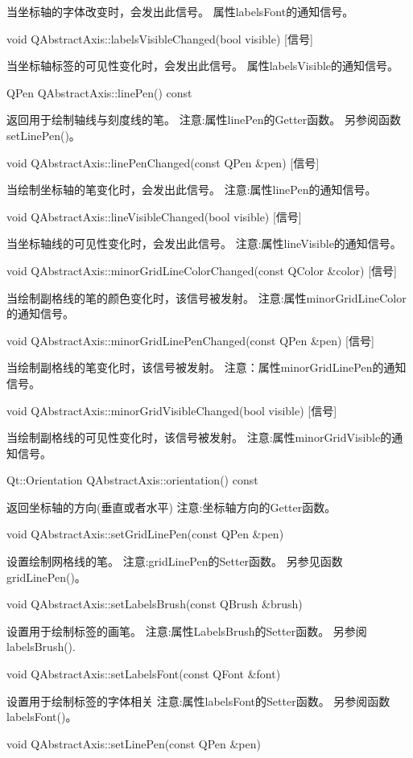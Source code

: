 当坐标轴的字体改变时，会发出此信号。 属性labelsFont的通知信号。

void QAbstractAxis::labelsVisibleChanged(bool visible) [信号] 

当坐标轴标签的可见性变化时，会发出此信号。 属性labelsVisible的通知信号。

QPen QAbstractAxis::linePen() const 

返回用于绘制轴线与刻度线的笔。 注意:属性linePen的Getter函数。 另参阅函数setLinePen()。

void QAbstractAxis::linePenChanged(const QPen \&pen) [信号] 

当绘制坐标轴的笔变化时，会发出此信号。 注意:属性linePen的通知信号。

void QAbstractAxis::lineVisibleChanged(bool visible) [信号] 

当坐标轴线的可见性变化时，会发出此信号。 注意:属性lineVisible的通知信号。

void QAbstractAxis::minorGridLineColorChanged(const QColor \&color)
[信号]

 当绘制副格线的笔的颜色变化时，该信号被发射。 注意:属性minorGridLineColor的通知信号。

void QAbstractAxis::minorGridLinePenChanged(const QPen \&pen) [信号] 

当绘制副格线的笔变化时，该信号被发射。 注意：属性minorGridLinePen的通知信号。

void QAbstractAxis::minorGridVisibleChanged(bool visible) [信号] 

当绘制副格线的可见性变化时，该信号被发射。 注意:属性minorGridVisible的通知信号。

Qt::Orientation QAbstractAxis::orientation() const 

返回坐标轴的方向(垂直或者水平) 注意:坐标轴方向的Getter函数。

void QAbstractAxis::setGridLinePen(const QPen \&pen) 

设置绘制网格线的笔。 注意:gridLinePen的Setter函数。 另参见函数gridLinePen()。

void QAbstractAxis::setLabelsBrush(const QBrush \&brush)

 设置用于绘制标签的画笔。 注意:属性LabelsBrush的Setter函数。 另参阅labelsBrush().

void QAbstractAxis::setLabelsFont(const QFont \&font) 

设置用于绘制标签的字体相关 注意:属性labelsFont的Setter函数。 另参阅函数labelsFont()。

void QAbstractAxis::setLinePen(const QPen \&pen) 

